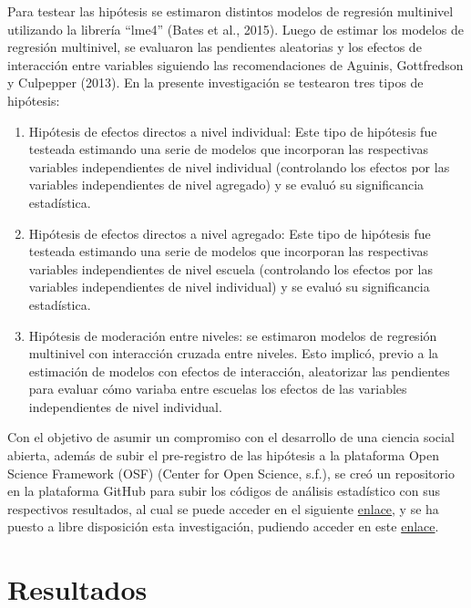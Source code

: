 \documentclass[12pt,twoside]{templates/facsothesis}
\begin{document}
Para testear las hipótesis se estimaron distintos modelos de regresión multinivel utilizando la librería ``lme4'' (Bates et al., 2015). Luego de estimar los modelos de regresión multinivel, se evaluaron las pendientes aleatorias y los efectos de interacción entre variables siguiendo las recomendaciones de Aguinis, Gottfredson y Culpepper (2013). En la presente investigación se testearon tres tipos de hipótesis:

\begin{enumerate}
\def\labelenumi{\arabic{enumi}.}
\item
  Hipótesis de efectos directos a nivel individual: Este tipo de hipótesis fue testeada estimando una serie de modelos que incorporan las respectivas variables independientes de nivel individual (controlando los efectos por las variables independientes de nivel agregado) y se evaluó su significancia estadística.
\item
  Hipótesis de efectos directos a nivel agregado: Este tipo de hipótesis fue testeada estimando una serie de modelos que incorporan las respectivas variables independientes de nivel escuela (controlando los efectos por las variables independientes de nivel individual) y se evaluó su significancia estadística.
\item
  Hipótesis de moderación entre niveles: se estimaron modelos de regresión multinivel con interacción cruzada entre niveles. Esto implicó, previo a la estimación de modelos con efectos de interacción, aleatorizar las pendientes para evaluar cómo variaba entre escuelas los efectos de las variables independientes de nivel individual.
\end{enumerate}

Con el objetivo de asumir un compromiso con el desarrollo de una ciencia social abierta, además de subir el pre-registro de las hipótesis a la plataforma Open Science Framework (OSF) (Center for Open Science, s.f.), se creó un repositorio en la plataforma GitHub para subir los códigos de análisis estadístico con sus respectivos resultados, al cual se puede acceder en el siguiente \href{https://github.com/anaisherrera/analisis-tesis}{enlace}, y se ha puesto a libre disposición esta investigación, pudiendo acceder en este \href{https://anaisherrera.github.io/tesis/}{enlace}.

\hypertarget{resultados}{%
\chapter{Resultados}\label{resultados}}
\end{document}
